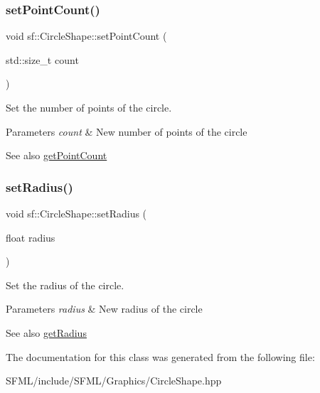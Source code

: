\subsubsection{\texorpdfstring{setPointCount()}{setPointCount()}}
{\footnotesize\ttfamily void sf\+::\+Circle\+Shape\+::set\+Point\+Count (\begin{DoxyParamCaption}\item[{std\+::size\+\_\+t}]{count }\end{DoxyParamCaption})}



Set the number of points of the circle. 


\begin{DoxyParams}{Parameters}
{\em count} & New number of points of the circle\\
\hline
\end{DoxyParams}
\begin{DoxySeeAlso}{See also}
\mbox{\hyperlink{classsf_1_1_circle_shape_a014d29ec11e8afa4dce50e7047d99601}{get\+Point\+Count}} \begin{DoxyVerb}\end{DoxyVerb}
 
\end{DoxySeeAlso}
\mbox{\label{classsf_1_1_circle_shape_a21cdf85fc2f201e10222a241af864be0}} 
\subsubsection{\texorpdfstring{setRadius()}{setRadius()}}
{\footnotesize\ttfamily void sf\+::\+Circle\+Shape\+::set\+Radius (\begin{DoxyParamCaption}\item[{float}]{radius }\end{DoxyParamCaption})}



Set the radius of the circle. 


\begin{DoxyParams}{Parameters}
{\em radius} & New radius of the circle\\
\hline
\end{DoxyParams}
\begin{DoxySeeAlso}{See also}
\mbox{\hyperlink{classsf_1_1_circle_shape_aa3dd5a1b5031486ce5b6f09d43674aa3}{get\+Radius}} \begin{DoxyVerb}\end{DoxyVerb}
 
\end{DoxySeeAlso}


The documentation for this class was generated from the following file\+:\begin{DoxyCompactItemize}
\item 
S\+F\+M\+L/include/\+S\+F\+M\+L/\+Graphics/Circle\+Shape.\+hpp\end{DoxyCompactItemize}
